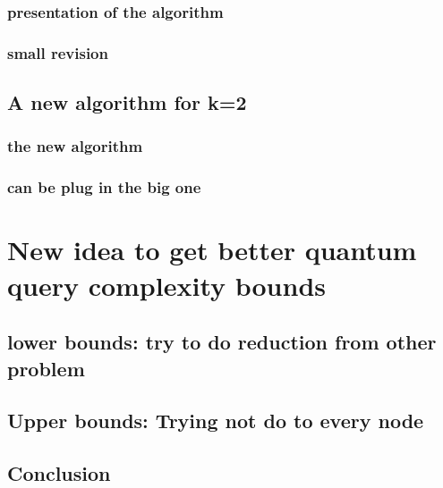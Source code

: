 \documentclass[9pt, notheorems]{beamer}
\theoremstyle{definition}
\theoremstyle{plain}
\theoremstyle{definition}
\begin{document}
\begin{frame}
    \frametitle{presentation of the algorithm}



\end{frame}

\begin{frame}
    \frametitle{small revision}



\end{frame}

\subsection{A new algorithm for k=2}

\begin{frame}
    \frametitle{the new algorithm}



\end{frame}

\begin{frame}
    \frametitle{can be plug in the big one}



\end{frame}

\section{New idea to get better quantum query complexity bounds }

\subsection{lower bounds: try to do reduction from other problem}
\begin{frame}
    \frametitle{}



\end{frame}
\subsection{Upper bounds: Trying not do to every node}
\begin{frame}
    \frametitle{}



\end{frame}
\subsection{Conclusion}
\end{document}
